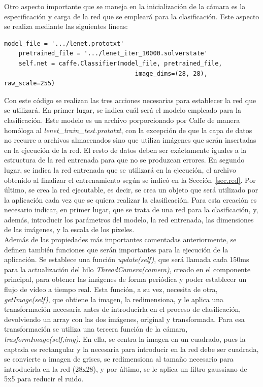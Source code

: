 Otro aspecto importante que se maneja en la inicialización de la cámara es la especificación y carga de la red que se empleará para la clasificación. Este aspecto se realiza mediante las siguientes líneas:
\vspace{10pt}
\begin{lstlisting}[frame=single]
	model_file = '.../lenet.prototxt'
	pretrained_file = '.../lenet_iter_10000.solverstate'
	self.net = caffe.Classifier(model_file, pretrained_file, 
									image_dims=(28, 28), raw_scale=255)
\end{lstlisting}

Con este código se realizan las tres acciones necesarias para establecer la red que se utilizará. En primer lugar, se indica cuál será el modelo empleado para la clasificación. Este modelo es un archivo porporcionado por Caffe de manera homóloga al \textit{lenet\_train\_test.prototxt}, con la excepción de que la capa de datos no recurre a archivos almacenados sino que utiliza imágenes que serán insertadas en la ejecución de la red. El resto de datos deben ser exáctamente iguales a la estructura de la red entrenada para que no se produzcan errores. En segundo lugar, se indica la red entrenada que se utilizará en la ejecución, el archivo obtenido al finalizar el entrenamiento según se indicó en la Sección~\ref{sec.red}. Por último, se crea la red ejecutable, es decir, se crea un objeto que será utilizado por la aplicación cada vez que se quiera realizar la clasificación. Para esta creación es necesario indicar, en primer lugar, que se trata de una red para la clasificación, y, además, introducir los parámetros del modelo, la red entrenada, las dimensiones de las imágenes, y la escala de los píxeles.\\

Además de las propiedades más importantes comentadas anteriormente, se definen también funciones que serán importantes para la ejecución de la aplicación. Se establece una función \textit{update(self)}, que será llamada cada 150ms para la actualización del hilo \textit{ThreadCamera(camera)}, creado en el componente principal, para obtener las imágenes de forma periódica y poder establecer un flujo de vídeo a tiempo real. Esta función, a su vez, necesita de otra, \textit{getImage(self)}, que obtiene la imagen, la redimensiona, y le aplica una transformación necesaria antes de introducirla en el proceso de clasificación, devolviendo un array con las dos imágenes, original y transformada. Para esa transformación se utiliza una tercera función de la cámara, \textit{trasformImage(self,img)}. En ella, se centra la imagen en un cuadrado, pues la captada es rectangular y la necesaria para introducir en la red debe ser cuadrada, se convierte a imagen de grises, se redimensiona al tamaño necesario para introducirla en la red (28x28), y por último, se le aplica un filtro gaussiano de 5x5 para reducir el ruido.\\

